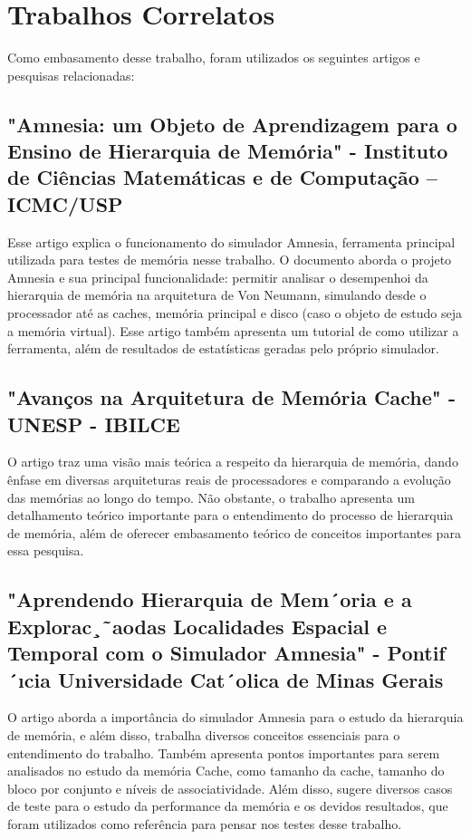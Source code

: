 \documentclass[conference]{IEEEtran}
\begin{document}
\section{Trabalhos Correlatos}
Como embasamento desse trabalho, foram utilizados os seguintes artigos e pesquisas relacionadas:
\subsection{"Amnesia: um Objeto de Aprendizagem para o Ensino de Hierarquia de Memória" - Instituto de Ciências Matemáticas e de Computação – ICMC/USP}
Esse artigo explica o funcionamento do simulador Amnesia, ferramenta principal utilizada para testes de memória nesse trabalho. O documento aborda o projeto Amnesia e sua principal funcionalidade: permitir analisar o desempenhoi da hierarquia  de memória na arquitetura de Von Neumann, simulando desde o processador até as caches, memória principal e disco (caso o objeto de estudo seja a memória virtual). Esse artigo também apresenta um tutorial de como utilizar a ferramenta, além de resultados de estatísticas geradas pelo próprio simulador.

\subsection{"Avanços na Arquitetura de Memória Cache" - UNESP - IBILCE}
O artigo traz uma visão mais teórica a respeito da hierarquia de memória, dando ênfase em diversas arquiteturas reais de processadores e comparando a evolução das memórias ao longo do tempo. Não obstante, o trabalho apresenta um detalhamento teórico importante para o entendimento do processo de hierarquia de memória, além de oferecer embasamento teórico de conceitos importantes para essa pesquisa.

\subsection{"Aprendendo Hierarquia de Mem´oria e a Explorac¸˜aodas Localidades Espacial e Temporal com o Simulador Amnesia" - Pontif´ıcia Universidade Cat´olica de Minas Gerais}
O artigo aborda a importância do simulador Amnesia para o estudo da hierarquia de memória, e além disso, trabalha diversos conceitos essenciais para o entendimento do trabalho. Também apresenta pontos importantes para serem analisados no estudo da memória Cache, como tamanho da cache, tamanho do bloco por conjunto e níveis de associatividade. Além disso, sugere diversos casos de teste para o estudo da performance da memória e os devidos resultados, que foram utilizados como referência para pensar nos testes desse trabalho.
\end{document}
